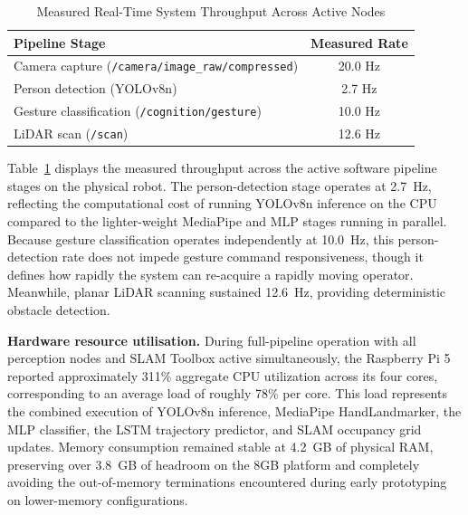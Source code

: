 \begin{table}[H]
\centering
\caption{Measured Real-Time System Throughput Across Active Nodes}
\label{tab:throughput}
\begin{tabular}{|l|c|}
\hline
\textbf{Pipeline Stage} & \textbf{Measured Rate} \\
\hline
Camera capture (\texttt{/camera/image\_raw/compressed}) & 20.0 Hz \\
\hline
Person detection (YOLOv8n) & 2.7 Hz \\
\hline
Gesture classification (\texttt{/cognition/gesture}) & 10.0 Hz \\
\hline
LiDAR scan (\texttt{/scan}) & 12.6 Hz \\
\hline
\end{tabular}
\end{table}

Table~\ref{tab:throughput} displays the measured throughput across the active software pipeline stages on the physical robot. The person-detection stage operates at 2.7~Hz, reflecting the computational cost of running YOLOv8n inference on the CPU compared to the lighter-weight MediaPipe and MLP stages running in parallel. Because gesture classification operates independently at 10.0~Hz, this person-detection rate does not impede gesture command responsiveness, though it defines how rapidly the system can re-acquire a rapidly moving operator. Meanwhile, planar LiDAR scanning sustained 12.6~Hz, providing deterministic obstacle detection.

\textbf{Hardware resource utilisation.} During full-pipeline operation with all perception nodes and SLAM Toolbox active simultaneously, the Raspberry Pi 5 reported approximately 311\% aggregate CPU utilization across its four cores, corresponding to an average load of roughly 78\% per core. This load represents the combined execution of YOLOv8n inference, MediaPipe HandLandmarker, the MLP classifier, the LSTM trajectory predictor, and SLAM occupancy grid updates. Memory consumption remained stable at 4.2~GB of physical RAM, preserving over 3.8~GB of headroom on the 8GB platform and completely avoiding the out-of-memory terminations encountered during early prototyping on lower-memory configurations.

